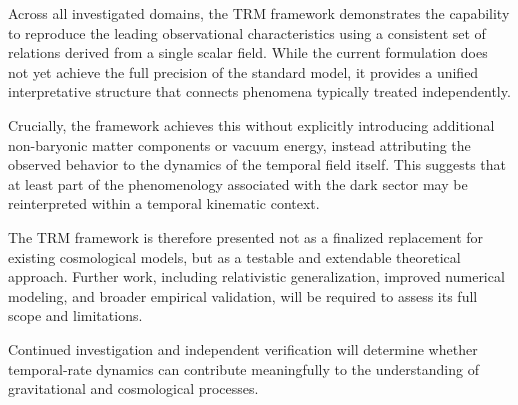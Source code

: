 \documentclass[11pt]{article}
\begin{document}
Across all investigated domains, the TRM framework demonstrates the capability to reproduce the leading observational characteristics using a consistent set of relations derived from a single scalar field. While the current formulation does not yet achieve the full precision of the standard model, it provides a unified interpretative structure that connects phenomena typically treated independently.

Crucially, the framework achieves this without explicitly introducing additional non-baryonic matter components or vacuum energy, instead attributing the observed behavior to the dynamics of the temporal field itself. This suggests that at least part of the phenomenology associated with the dark sector may be reinterpreted within a temporal kinematic context.

The TRM framework is therefore presented not as a finalized replacement for existing cosmological models, but as a testable and extendable theoretical approach. Further work, including relativistic generalization, improved numerical modeling, and broader empirical validation, will be required to assess its full scope and limitations.

Continued investigation and independent verification will determine whether temporal-rate dynamics can contribute meaningfully to the understanding of gravitational and cosmological processes.
\end{document}
